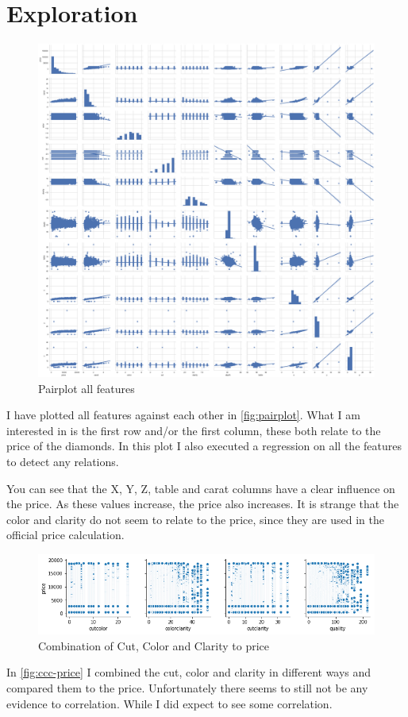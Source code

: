 \documentclass{scrreprt}
\begin{document}
	\chapter{Exploration}
		\begin{figure}[h]
			\includegraphics[width=\linewidth]{pairplot}
			\caption{Pairplot all features}
			\label{fig:pairplot}
			\centering
		\end{figure}
		I have plotted all features against each other in \autoref{fig:pairplot}. What I am interested in is the first row and/or the first column, these both relate to the price of the diamonds. In this plot I also executed a regression on all the features to detect any relations.\par
		You can see that the X, Y, Z, table and carat columns have a clear influence on the price. As these values increase, the price also increases. It is strange that the color and clarity do not seem to relate to the price, since they are used in the official price calculation.\par
		
		\begin{figure}[h]
			\includegraphics[width=\linewidth]{cut-color-clarity-combi}
			\caption{Combination of Cut, Color and Clarity to price}
			\label{fig:ccc-price}
			\centering
		\end{figure}
		In \autoref{fig:ccc-price} I combined the cut, color and clarity in different ways and compared them to the price. Unfortunately there seems to still not be any evidence to correlation. While I did expect to see some correlation.
		
\end{document}
